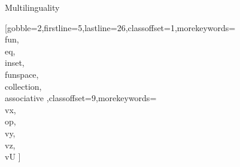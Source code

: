 \documentclass[lang={en,de}]{stex}
\begin{document}
  \begin{sfragment}{Multilinguality}


    [gobble=2,firstline=5,lastline=26,classoffset=1,morekeywords={
    \\fun,\\eq,\\inset,
    \\funspace,\\collection,\\associative
    },classoffset=9,morekeywords={
      \\vx,\\op,\\vy,\\vz,\\vU
    }]
    
  \end{sfragment}
\end{document}
